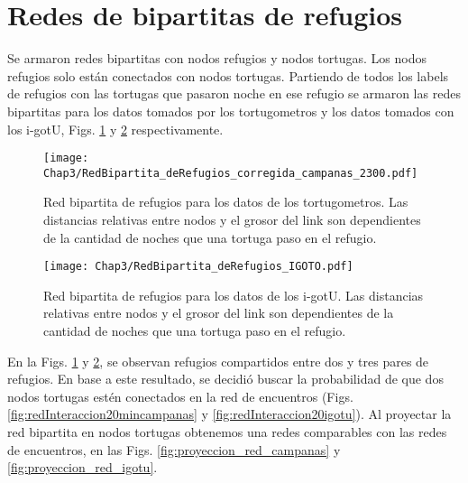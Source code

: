  
 
 
\section{Redes  de bipartitas de refugios}
Se armaron redes bipartitas con nodos refugios y nodos tortugas. Los nodos refugios solo están conectados con nodos tortugas.  Partiendo de todos los labels de refugios con las tortugas que pasaron noche en ese refugio se armaron las redes bipartitas para los datos tomados por los tortugometros y los datos tomados con los i-gotU, Figs. \ref{fig:red_bipartita_refus_campanas} y \ref{fig:red_bipartita_refus_igotu} respectivamente.
 
\begin{figure}[ht]
    \begin{center}
        \texttt{[image: Chap3/RedBipartita\_deRefugios\_corregida\_campanas\_2300.pdf]}
        \caption[Red bipartita de refugios para los datos de los tortugometros.]{Red bipartita de refugios para los datos de los tortugometros. Las distancias relativas entre nodos y el grosor del link son dependientes de la cantidad de noches que una  tortuga paso en el refugio. }
        \label{fig:red_bipartita_refus_campanas}
       
        \end{center}
\end{figure}
 
\begin{figure}[ht]
    \begin{center}
        \texttt{[image: Chap3/RedBipartita\_deRefugios\_IGOTO.pdf]}
        \caption[Red bipartita de refugios para los datos de los i-gotU.]{Red bipartita de refugios para los datos de los i-gotU. Las distancias relativas entre nodos y el grosor del link son dependientes de la cantidad de noches que una  tortuga paso en el refugio. }
        \label{fig:red_bipartita_refus_igotu}
       
        \end{center}
\end{figure}
En la Figs. \ref{fig:red_bipartita_refus_campanas} y \ref{fig:red_bipartita_refus_igotu}, se observan refugios compartidos entre dos y tres pares de refugios.  En base a este resultado, se decidió buscar la probabilidad de que dos nodos tortugas estén conectados en la red de encuentros (Figs. \ref{fig:redInteraccion20mincampanas} y \ref{fig:redInteraccion20igotu}). Al proyectar la red bipartita en nodos tortugas obtenemos una redes comparables con las redes de encuentros, en las Figs. \ref{fig:proyeccion_red_campanas} y \ref{fig:proyeccion_red_igotu}.
 
